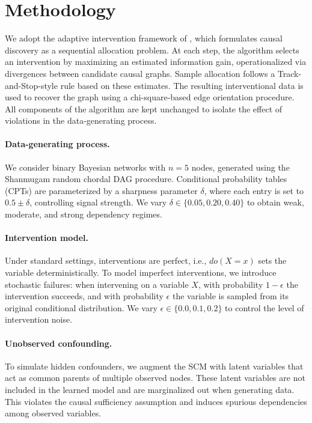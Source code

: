 \documentclass{article}
\begin{document}
\section{Methodology}
We adopt the adaptive intervention framework of \citet{elahi2024adaptive}, which formulates causal discovery as a sequential allocation problem. At each step, the algorithm selects an intervention by maximizing an estimated information gain, operationalized via divergences between candidate causal graphs. Sample allocation follows a Track-and-Stop-style rule based on these estimates. The resulting interventional data is used to recover the graph using a chi-square-based edge orientation procedure. All components of the algorithm are kept unchanged to isolate the effect of violations in the data-generating process.

\paragraph{Data-generating process.}
We consider binary Bayesian networks with $n=5$ nodes, generated using the Shanmugam random chordal DAG procedure. Conditional probability tables (CPTs) are parameterized by a sharpness parameter $\delta$, where each entry is set to $0.5 \pm \delta$, controlling signal strength. We vary $\delta \in \{0.05, 0.20, 0.40\}$ to obtain weak, moderate, and strong dependency regimes.

\paragraph{Intervention model.}
Under standard settings, interventions are perfect, i.e., $do(X = x)$ sets the variable deterministically. To model imperfect interventions, we introduce stochastic failures: when intervening on a variable $X$, with probability $1 - \epsilon$ the intervention succeeds, and with probability $\epsilon$ the variable is sampled from its original conditional distribution. We vary $\epsilon \in \{0.0, 0.1, 0.2\}$ to control the level of intervention noise.

\paragraph{Unobserved confounding.}
To simulate hidden confounders, we augment the SCM with latent variables that act as common parents of multiple observed nodes. These latent variables are not included in the learned model and are marginalized out when generating data. This violates the causal sufficiency assumption and induces spurious dependencies among observed variables.
\end{document}
